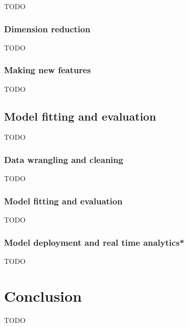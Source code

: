 \documentclass[12pt, a4paper]{report}
\theoremstyle{plain}
\theoremstyle{plain}
\theoremstyle{remark}
\begin{document}
TODO

\subsection{Dimension reduction}
\label{subsec:ccfm_fe_dimension_reduction}

TODO

\subsection{Making new features}
\label{subsec:ccfm_fe_making_new_features}

TODO

\section{Model fitting and evaluation}
\label{sec:ccfm_model_fitting_and_evaluation}

TODO

\subsection{Data wrangling and cleaning}
\label{subsec:ccfm_mfae_data_wrangling_and_cleaning}

TODO

\subsection{Model fitting and evaluation}
\label{subsec:ccfm_mfae_model_fitting_and_evaluation}

TODO

\subsection*{Model deployment and real time analytics*}
\label{subsec:ccfm_mfae_model_deployment_and_real_time_analytics}

TODO

\chapter*{Conclusion}
\label{chap:conclusion}

TODO


\end{document}
